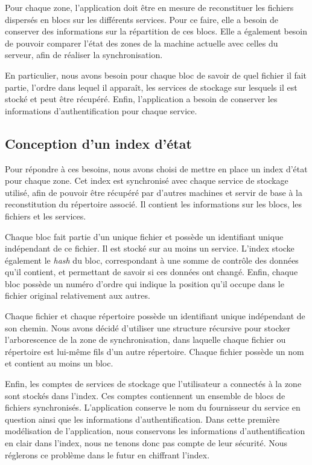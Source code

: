 Pour chaque zone, l'application doit être en mesure de reconstituer les fichiers dispersés en blocs sur les différents services. Pour ce faire, elle a besoin de conserver des informations sur la répartition de ces blocs. Elle a également besoin de pouvoir comparer l'état des zones de la machine actuelle avec celles du serveur, afin de réaliser la synchronisation.

En particulier, nous avons besoin pour chaque bloc de savoir de quel fichier il fait partie, l'ordre dans lequel il apparaît, les services de stockage sur lesquels il est stocké et peut être récupéré. Enfin, l'application a besoin de conserver les informations d'authentification pour chaque service.

\subsection{Conception d'un index d'état}

Pour répondre à ces besoins, nous avons choisi de mettre en place un index d'état pour chaque zone. Cet index est synchronisé avec chaque service de stockage utilisé, afin de pouvoir être récupéré par d'autres machines et servir de base à la reconstitution du répertoire associé. Il contient les informations sur les blocs, les fichiers et les services.

Chaque bloc fait partie d’un unique fichier et possède un identifiant unique indépendant de ce fichier. Il est stocké sur au moins un service. L'index stocke également le \emph{hash} du bloc, correspondant à une somme de contrôle des données qu’il contient, et permettant de savoir si ces données ont changé. Enfin, chaque bloc possède un numéro d’ordre qui indique la position qu’il occupe dans le fichier original relativement aux autres.

Chaque fichier et chaque répertoire possède un identifiant unique indépendant de son chemin. Nous avons décidé d'utiliser une structure récursive pour stocker l'arborescence de la zone de synchronisation, dans laquelle chaque fichier ou répertoire est lui-même fils d'un autre répertoire. Chaque fichier possède un nom et contient au moins un bloc.

Enfin, les comptes de services de stockage que l'utilisateur a connectés à la zone sont stockés dans l'index. Ces comptes contiennent un ensemble de blocs de fichiers synchronisés. L'application conserve le nom du fournisseur du service en question ainsi que les informations d'authentification. Dans cette première modélisation de l'application, nous conservons les informations d'authentification en clair dans l'index, nous ne tenons donc pas compte de leur sécurité. Nous réglerons ce problème dans le futur en chiffrant l'index.

